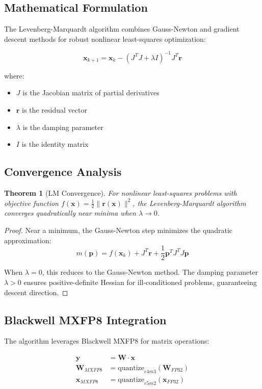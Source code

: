 \documentclass[11pt,a4paper]{article}
\newtheorem{theorem}{Theorem}[section]
\newtheorem{proof}{Proof}
\begin{document}
\subsection{Mathematical Formulation}

The Levenberg-Marquardt algorithm combines Gauss-Newton and gradient descent methods for robust nonlinear least-squares optimization:

\[\mathbf{x}_{k+1} = \mathbf{x}_k - \left(J^T J + \lambda I\right)^{-1} J^T \mathbf{r}\]

where:
\begin{itemize}
    \item $J$ is the Jacobian matrix of partial derivatives
    \item $\mathbf{r}$ is the residual vector
    \item $\lambda$ is the damping parameter
    \item $I$ is the identity matrix
\end{itemize}

\subsection{Convergence Analysis}

\begin{theorem}[LM Convergence]
For nonlinear least-squares problems with objective function $f(\mathbf{x}) = \frac{1}{2} \|\mathbf{r}(\mathbf{x})\|^2$, the Levenberg-Marquardt algorithm converges quadratically near minima when $\lambda \to 0$.
\end{theorem}

\begin{proof}
Near a minimum, the Gauss-Newton step minimizes the quadratic approximation:
\[m(\mathbf{p}) = f(\mathbf{x}_k) + J^T \mathbf{r} + \frac{1}{2} \mathbf{p}^T J^T J \mathbf{p}\]

When $\lambda = 0$, this reduces to the Gauss-Newton method. The damping parameter $\lambda > 0$ ensures positive-definite Hessian for ill-conditioned problems, guaranteeing descent direction.
\end{proof}

\subsection{Blackwell MXFP8 Integration}

The algorithm leverages Blackwell MXFP8 for matrix operations:

\begin{align}
\mathbf{y} &= \mathbf{W} \cdot \mathbf{x} \\
\mathbf{W}_{MXFP8} &= \text{quantize}_{e4m3}(\mathbf{W}_{FP32}) \\
\mathbf{x}_{MXFP8} &= \text{quantize}_{e5m2}(\mathbf{x}_{FP32})
\end{align}
\end{document}

